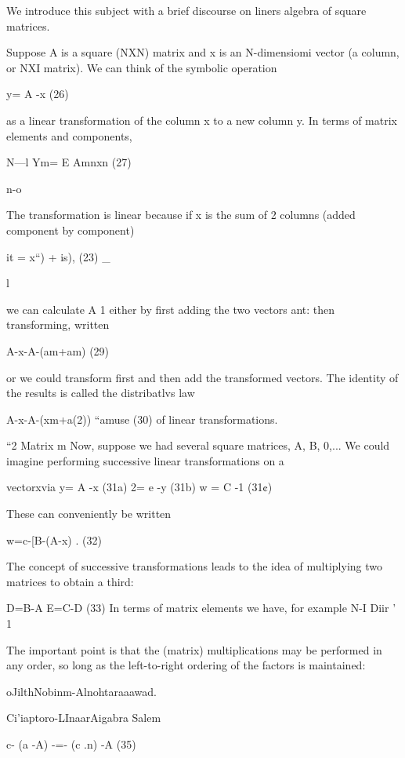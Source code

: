 {{{{{{{{{{{We introduce this subject with a brief discourse on liners
algebra of square matrices.

Suppose A is a square (NXN) matrix and x is an N-dimensiomi
vector (a column, or NXI matrix). We can think of the symbolic
operation

y= A -x (26)

 

as a linear transformation of the column x to a new column y. In
terms of matrix elements and components,

N—l
Ym= E Amnxn (27)

n-o

The transformation is linear because if x is the sum of 2 columns
(added component by component)

it = x“) + is), (23) _

l

we can calculate A 1 either by ﬁrst adding the two vectors ant:
then transforming, written

A-x-A-(am+am) (29)

or we could transform ﬁrst and then add the transformed vectors.
The identity of the results is called the distribatlvs law

A-x-A-(xm+a(2)) “amuse (30)
of linear transformations.

“2 Matrix m
Now, suppose we had several square matrices, A, B, 0,... We
could imagine performing successive linear transformations on a

vectorxvia
y= A -x (31a)
2= e -y (31b)
w = C -1 (31¢)

These can conveniently be written

w=c-[B-(A-x) . (32)

 

The concept of successive transformations leads to the idea of
multiplying two matrices to obtain a third:

D=B-A E=C-D (33)
In terms of matrix elements we have, for example
N-I
Diir ' 1%

The important point is that the (matrix) multiplications may be
performed in any order, so long as the left-to-right ordering of
the factors is maintained:

oJilthNobinm-Alnohtaraaawad.

Ci'iaptoro-LInaarAigabra Salem

   
  
  
  
  

c- (a -A) -=- (c .n) -A (35)

}}}}}}}}}}}
